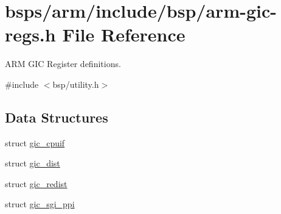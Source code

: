 \hypertarget{arm-gic-regs_8h}{}\section{bsps/arm/include/bsp/arm-\/gic-\/regs.h File Reference}
\label{arm-gic-regs_8h}


A\+RM G\+IC Register definitions.  


{\ttfamily \#include $<$bsp/utility.\+h$>$}\newline
\subsection*{Data Structures}
\begin{DoxyCompactItemize}
\item 
struct \mbox{\hyperlink{structgic__cpuif}{gic\+\_\+cpuif}}
\item 
struct \mbox{\hyperlink{structgic__dist}{gic\+\_\+dist}}
\item 
struct \mbox{\hyperlink{structgic__redist}{gic\+\_\+redist}}
\item 
struct \mbox{\hyperlink{structgic__sgi__ppi}{gic\+\_\+sgi\+\_\+ppi}}
\end{DoxyCompactItemize}
